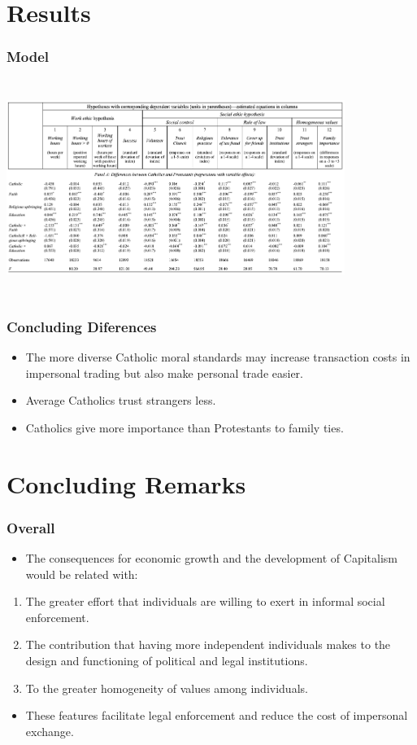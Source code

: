 \documentclass[pdftex,12pt,xcolor=pdftex,table]{beamer}
\begin{document}
\section{Results}
\begin{frame}
\frametitle{Model}
\includegraphics[width=11cm, height=7cm]{hola}
\centering
\end{frame}
\begin{frame}
\frametitle{Concluding Diferences}
\begin{itemize}
\item The more diverse Catholic moral standards may increase transaction costs in impersonal trading but
also make personal trade easier.
\item Average Catholics trust strangers less.
\item Catholics give more importance than Protestants to family ties.
\end{itemize}
\end{frame}
\section{Concluding Remarks}
\begin{frame}
\frametitle{Overall}
\begin{itemize}
\item The consequences for economic growth and the development of Capitalism would be related with:
\end{itemize}
\begin{enumerate}
\item The greater effort that individuals are willing to exert in informal social enforcement.
\item The contribution that having more independent individuals makes to the design and functioning of political and legal
institutions.
\item To the greater homogeneity of values among individuals.
\end{enumerate}
\begin{itemize}
\item These features facilitate legal enforcement and reduce the cost of impersonal exchange. 
\end{itemize}
\end{frame}
\end{document}
